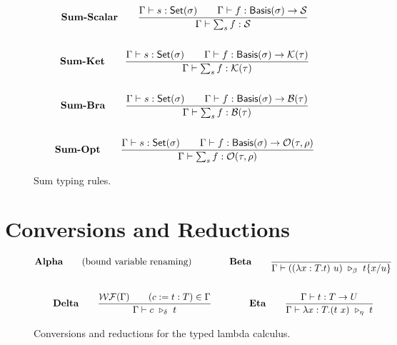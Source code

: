 \documentclass{article}
\begin{document}
\begin{figure}[h]
    \begin{gather*}
        \textbf{Sum-Scalar} \qquad
        \frac{\Gamma \vdash s : \mathsf{Set}(\sigma) \qquad \Gamma \vdash f : \mathsf{Basis}(\sigma) \to \mathcal{S}}{\Gamma \vdash \sum_{s} f : \mathcal{S}} \\
        \\
        \textbf{Sum-Ket} \qquad
        \frac{\Gamma \vdash s : \mathsf{Set}(\sigma) \qquad \Gamma \vdash f : \mathsf{Basis}(\sigma) \to \mathcal{K}(\tau)}{\Gamma \vdash \sum_{s} f : \mathcal{K}(\tau)} \\
        \\
        \textbf{Sum-Bra} \qquad
        \frac{\Gamma \vdash s : \mathsf{Set}(\sigma) \qquad \Gamma \vdash f : \mathsf{Basis}(\sigma) \to \mathcal{B}(\tau)}{\Gamma \vdash \sum_{s} f : \mathcal{B}(\tau)} \\
        \\
        \textbf{Sum-Opt} \qquad
        \frac{\Gamma \vdash s : \mathsf{Set}(\sigma) \qquad \Gamma \vdash f : \mathsf{Basis}(\sigma) \to \mathcal{O}(\tau, \rho)}{\Gamma \vdash \sum_{s} f : \mathcal{O}(\tau, \rho)}
    \end{gather*}
    \caption{Sum typing rules.}
\end{figure}

\clearpage
\section{Conversions and Reductions}
\begin{figure}[h]
    \begin{gather*}
        \textbf{Alpha} \qquad \text{(bound variable renaming)}
        \qquad \qquad
        \textbf{Beta} \qquad
        \frac{}{\Gamma \vdash ((\lambda x:T.t)\ u)\ \reduce_\beta\ t\{x/u\}} \\
        \\
        \textbf{Delta} \qquad
        \frac{\WF(\Gamma) \qquad (c:=t:T) \in \Gamma}{\Gamma \vdash c\ \reduce_\delta\ t}
        \qquad \qquad
        \textbf{Eta} \qquad
        \frac{\Gamma\vdash t : T \to U}{\Gamma \vdash \lambda x : T . (t\ x)\ \reduce_\eta\ t}
    \end{gather*}
    \caption{Conversions and reductions for the typed lambda calculus.}
\end{figure}

\newenvironment{ruletable}[1]
{
    \begin{longtable}{cl}
    \caption{#1}\\
    \hline
    \textbf{Rule} & \textbf{Description} \\
    \hline
    \endfirsthead

    \hline
    \textbf{Rule} & \textbf{Description} \\
    \hline
    \endhead

    \hline
    \multicolumn{2}{r}{\textit{Continued on the next page}} \\
    \hline
    \endfoot

    \hline
    \endlastfoot
}
{
    \end{longtable}
}
\end{document}
